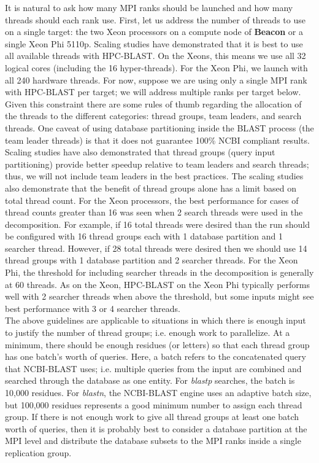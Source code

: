 \documentclass[10pt]{article}
\newcommand{\beac}{\textbf{Beacon }}
\begin{document}
It is natural to ask how many MPI ranks should be launched and how many threads should each rank use.  First, let us address the number of threads to use
on a single target: the two Xeon processors on a compute node of \beac or a single Xeon Phi 5110p.  Scaling studies have demonstrated that it is best to use
all available threads with HPC-BLAST.  On the Xeons, this means we use all 32 logical cores (including the 16 hyper-threads).  For the Xeon Phi, we launch with
all 240 hardware threads.  For now, suppose we are using only a single MPI rank with HPC-BLAST per target; we will address multiple ranks per target below.
Given this constraint there are some rules of thumb regarding the allocation of the threads to the different categories: thread groups, team leaders, and search threads.
One caveat of using database partitioning inside the BLAST process (the team leader threads) is that it does not guarantee 100\% NCBI compliant results.  Scaling
studies have also demonstrated that thread groups (query input partitioning) provide better speedup relative to team leaders and search threads; thus, we will not
include team leaders in the best practices.  The scaling studies also demonstrate that the benefit of thread groups alone has a limit based on total thread count.
For the Xeon processors, the best performance for cases of thread counts greater than 16 was seen when 2 search threads were used in the decomposition.
For example, if 16 total threads were desired than the run should be configured with 16 thread groups each with 1 database partition and 1 searcher thread.
However, if 28 total threads were desired then we should use 14 thread groups with 1 database partition and 2 searcher threads.  For the Xeon Phi, the threshold
for including searcher threads in the decomposition is generally at 60 threads. As on the Xeon, HPC-BLAST on the Xeon Phi typically performs well with 2 searcher
threads when above the threshold, but some inputs might see best performance with 3 or 4 searcher threads.\\

The above guidelines are applicable to situations in which there is enough input to justify the number of thread groups; i.e. enough work to parallelize.
At a minimum, there should be enough residues (or letters) so that each thread group has one batch's worth of queries.  Here, a batch refers to the concatenated
query that NCBI-BLAST uses; i.e. multiple queries from the input are combined and searched through the database as one entity.  For \emph{blastp} searches, the batch
is 10,000 residues.  For \emph{blastn}, the NCBI-BLAST engine uses an adaptive batch size, but 100,000 residues represents a good minimum number to assign each
thread group.  If there is not enough work to give all thread groups at least one batch worth of queries, then it is probably best to consider a database partition at the MPI
level and distribute the database subsets to the MPI ranks inside a single replication group.\\
\end{document}
